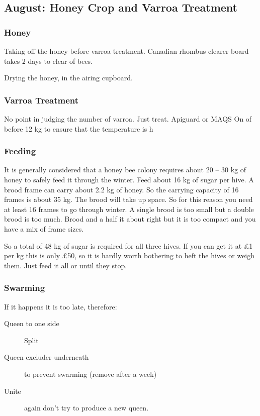 \subsection{August: Honey Crop and Varroa Treatment}

\subsubsection{Honey}

Taking off the honey before varroa treatment.
Canadian rhombus clearer board takes 2 days to clear of bees.

Drying the honey,
in the airing cupboard.

\subsubsection{Varroa Treatment}

No point in judging the number of varroa.
Just treat.
Apiguard or MAQS
On of before 12 kg to ensure that the temperature is h

\subsubsection{Feeding}

It is
generally considered that a honey bee colony requires about 20 – 30 kg of honey to
safely feed it through the winter. 
Feed about 16 kg of sugar per hive.
A brood frame can carry about 2.2 kg of honey.  
So the carrying capacity of 16 frames is about 35 kg.
The brood will take up space.
So for this reason you need at least 16 frames to go through winter.
A single brood is too small but a double brood is too much.
Brood and a half it about right but it is too compact
and you have a mix of frame sizes.

 So a total of 48 kg of sugar is required for all three hives.
 If you can get it at \pounds 1 per kg this is only £50,
 so it is hardly worth bothering to heft the hives or weigh them.
 Just feed it all or until they stop.
 
\subsubsection{Swarming}

 If it happens it is too late, therefore:

\begin{description}
  \item [Queen to one side] Split
  \item [Queen excluder underneath] to prevent swarming (remove after a week)
  \item [Unite] again don't try to produce a new queen.
\end{description}

